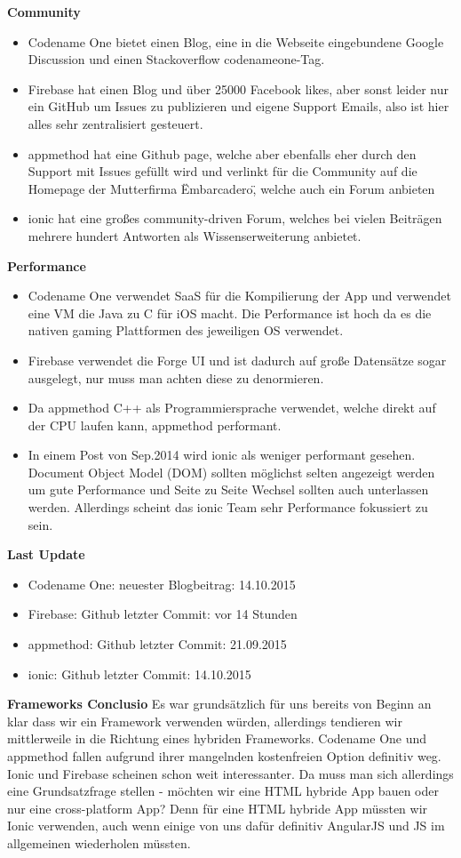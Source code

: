 \textbf{Community}
\begin{itemize}
\item Codename One bietet einen Blog, eine in die Webseite eingebundene Google Discussion und einen Stackoverflow codenameone-Tag.
\item Firebase hat einen Blog und über 25000 Facebook likes, aber sonst leider nur ein GitHub um Issues zu publizieren und eigene Support Emails, also ist hier alles sehr zentralisiert gesteuert. 
\item appmethod hat eine Github page, welche aber ebenfalls eher durch den Support mit Issues gefüllt wird und verlinkt für die Community auf die Homepage der Mutterfirma \"Embarcadero\", welche auch ein Forum anbieten
\item ionic hat eine großes community-driven Forum, welches bei vielen Beiträgen mehrere hundert Antworten als Wissenserweiterung anbietet.
\end{itemize}

\textbf{Performance}
\begin{itemize}
\item Codename One verwendet SaaS für die Kompilierung der App und verwendet eine VM die Java zu C für iOS macht. Die Performance ist hoch da es die nativen gaming Plattformen des jeweiligen OS verwendet. 
\item Firebase verwendet die Forge UI und ist dadurch auf große Datensätze sogar ausgelegt, nur muss man achten diese zu denormieren.
\item Da appmethod C++ als Programmiersprache verwendet, welche direkt auf der CPU laufen kann, appmethod performant.
\item In einem Post von Sep.2014 wird ionic als weniger performant gesehen. Document Object Model (DOM) sollten möglichst selten angezeigt werden um gute Performance und Seite zu Seite Wechsel sollten auch unterlassen werden. Allerdings scheint das ionic Team sehr Performance fokussiert zu sein.
\end{itemize}

\textbf{Last Update}
\begin{itemize}
\item Codename One: neuester Blogbeitrag: 14.10.2015
\item Firebase: Github letzter Commit: vor 14 Stunden
\item appmethod: Github letzter Commit: 21.09.2015
\item ionic: Github letzter Commit: 14.10.2015
\end{itemize}

\textbf{Frameworks Conclusio}
Es war grundsätzlich für uns bereits von Beginn an klar dass wir ein Framework verwenden würden, allerdings tendieren wir mittlerweile in die Richtung eines hybriden Frameworks. Codename One und appmethod fallen aufgrund ihrer mangelnden kostenfreien Option definitiv weg. Ionic und Firebase scheinen schon weit interessanter.
Da muss man sich allerdings eine Grundsatzfrage stellen - möchten wir eine HTML hybride App bauen oder nur eine cross-platform App? Denn für eine HTML hybride App müssten wir Ionic verwenden, auch wenn einige von uns dafür definitiv AngularJS und JS im allgemeinen wiederholen müssten.


\clearpage %